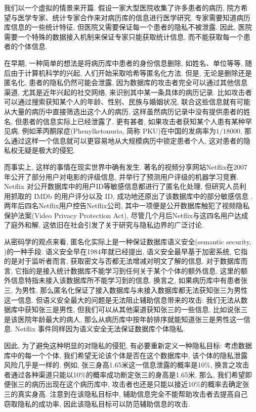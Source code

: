 我们以一个虚拟的情景来开篇. 假设一家大型医院收集了许多患者的病历, 院方希望与医学专家、统计专家合作来对病历库的信息进行医学研究. 专家需要知道病历库信息的一些统计特征, 但医院又需要保证每一个患者的隐私不被泄露. 因此, 医院需要一个特殊的数据接入机制来保证专家只能获取统计信息, 而不能获取每一个患者的个体信息. 

在早期, 一种简单的想法是将病历库中患者的身份信息删除, 如姓名、单位等等, 随后由于计算机科学的兴起, 人们开始采取哈希等匿名化方法. 但是, 无论是删除还是匿名化, 患者的隐私仍然可能会泄露, 因为数据库的攻击者完全可以通过其他信息渠道, 尤其是近年兴起的社交网络, 来识别其中某一条具体的病历记录. 比如攻击者可以通过搜索获知某个人的年龄、性别、民族与婚姻状况, 联合这些信息就有可能从大量的病历中直接筛选出这个人的病历, 这样虽然病历记录中没有提供患者的姓名, 但患者的信息实际上已经泄露了. 更有甚者, 如果攻击者获知某个人患有某种罕见病, 例如苯丙酮尿症(Phenylketonuria, 简称 PKU)在中国的发病率为$1/18000$\parencite{shen1986newborn}, 那么通过这样一个信息就可以更容易地从大规模病历中锁定患者个人, 这对患者的隐私权无疑是极大的侵犯.

而事实上, 这样的事情在现实世界中确有发生. 著名的视频分享网站Netflix在2007年公开了部分用户对电影的评级信息, 并举行了预测用户评级的机器学习竞赛. Netflix 对公开数据库中的用户ID等敏感信息都进行了匿名化处理, 但研究人员利用抓取的 IMDb 的用户评分以及 ID, 成功地还原出了该数据库中的部分敏感信息
\parencite{narayanan2008robust}. 两年后四名Netflix用户控告Netflix公司, 其中一项便是公开数据库触犯了视频隐私保护法案(Video Privacy Protection Act), 尽管几个月后Netflix与这四名用户达成了庭外和解, 这依旧在社会引发了关于研究与隐私边界的广泛讨论.

从密码学的观点来看, 匿名化实际上是一种保证数据库语义安全(semantic security, \parencite{goldwasser1984probabilistic})的一种手段. 语义安全早在1984年就已经提出, 语义安全最早基于加密系统, 它指的是对于监听者而言, 获取密文与否都无法增减对明文了解的信息. 对于数据库而言,  它指的是接入统计数据库不能学习到任何关于某个个体的额外信息, 这里的额外信息特指未接入该数据库所不能学习到的信息. 换言之, 如果病历库中有患者张三, 为男性, 那么匿名化保证了接入数据库与未接入数据库都无法获知张三为男性这一信息. 但语义安全最大的问题是无法阻止辅助信息带来的攻击: 我们无法从数据库中获知张三是男性, 但我们可以从其他渠道获知张三的一些信息, 比如说张三是该医院年龄最大的病人, 那么从病历库中按年龄排序就能知道张三是男性这一信息. Netflix 事件同样因为语义安全无法保证数据库个体隐私.

因此, 为了避免这种明显的对隐私的侵犯, 有必要重新定义一种隐私目标: 考虑数据库中的每一个个体, 我们希望无论该个体是否在这个数据库中, 该个体的隐私泄露风险几乎是一样的. 例如, 张三身高1.65米这一信息泄露的概率是10\%, 换言之攻击者通过各种渠道只能以10\%的概率成功断定张三的身高是1.65米, 那么, 我们希望即便张三的病历出现在这个病历库中, 攻击者也还是只能以接近10\%的概率去确定张三的真实身高. 注意到在该隐私目标中, 辅助信息完全不能帮助攻击者去提高自己窃取隐私的成功率, 因此该隐私目标可以防范辅助信息的攻击.

